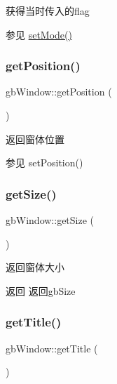 获得当时传入的flag 

\begin{DoxySeeAlso}{参见}
\mbox{\hyperlink{classgb_window_abf2068b28248fb4f9ed5d39a5df58d0a}{set\+Mode()}} 
\end{DoxySeeAlso}
\mbox{\label{classgb_window_acf7f12b75b0b9b3f25105569f77e8f80}} 
\subsubsection{\texorpdfstring{getPosition()}{getPosition()}}
{\footnotesize\ttfamily gb\+Window\+::get\+Position (\begin{DoxyParamCaption}{ }\end{DoxyParamCaption})}



返回窗体位置 

\begin{DoxySeeAlso}{参见}
set\+Position() 
\end{DoxySeeAlso}
\mbox{\label{classgb_window_af329e62282ec4ed7184eb8c58d7f7809}} 
\subsubsection{\texorpdfstring{getSize()}{getSize()}}
{\footnotesize\ttfamily gb\+Window\+::get\+Size (\begin{DoxyParamCaption}{ }\end{DoxyParamCaption})}



返回窗体大小 

\begin{DoxyReturn}{返回}
返回gb\+Size 
\end{DoxyReturn}
\mbox{\label{classgb_window_a42dac83ea2862f0e5277eaf1df4bf740}} 
\subsubsection{\texorpdfstring{getTitle()}{getTitle()}}
{\footnotesize\ttfamily gb\+Window\+::get\+Title (\begin{DoxyParamCaption}{ }\end{DoxyParamCaption})}



